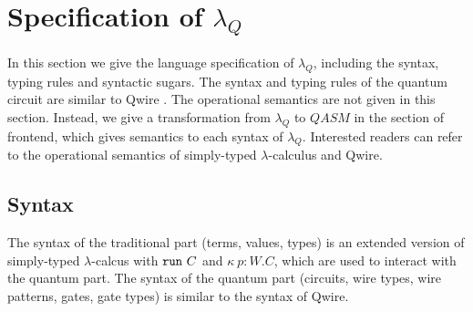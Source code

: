 \section{Specification of $\lambda_Q$} \label{spec}

In this section we give the language specification of $\lambda_Q$, including the syntax, typing rules and syntactic sugars.
The syntax and typing rules of the quantum circuit are similar to Qwire \cite{qwire}.
The operational semantics are not given in this section.
Instead, we give a transformation from $\lambda_Q$ to $QASM$ in the section of frontend, which gives semantics to each syntax of $\lambda_Q$.
Interested readers can refer to the operational semantics of simply-typed $\lambda$-calculus and Qwire.

\subsection{Syntax}
The syntax of the traditional part (terms, values, types) is an extended version of simply-typed $\lambda$-calcus with $\mathtt{run}\ C$ and $\kappa \ p:W . C$, which are used to interact with the quantum part.
The syntax of the quantum part (circuits, wire types, wire patterns, gates, gate types) is similar to the syntax of Qwire.

